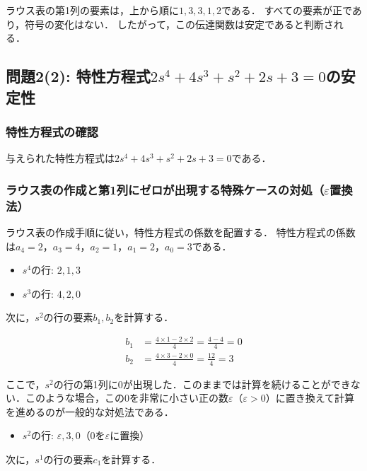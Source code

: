 \documentclass[11pt,a4paper]{ltjsarticle}
\begin{document}
ラウス表の第1列の要素は，上から順に$1, 3, 3, 1, 2$である．
すべての要素が正であり，符号の変化はない．
したがって，この伝達関数は安定であると判断される．

\subsection{\texorpdfstring{問題2(2): 特性方程式$2s^4+4s^3+s^2+2s+3=0$の安定性}{問題2(2): 特性方程式の安定性}}

\subsubsection{特性方程式の確認}

与えられた特性方程式は$2s^4+4s^3+s^2+2s+3=0$である．

\subsubsection{\texorpdfstring{ラウス表の作成と第1列にゼロが出現する特殊ケースの対処（$\varepsilon$置換法）}{ラウス表の作成と第1列にゼロが出現する特殊ケースの対処（イプシロン置換法）}}

ラウス表の作成手順に従い，特性方程式の係数を配置する．
特性方程式の係数は$a_4=2$，$a_3=4$，$a_2=1$，$a_1=2$，$a_0=3$である．

\begin{itemize}
\item $s^4$の行: $2, 1, 3$
\item $s^3$の行: $4, 2, 0$
\end{itemize}

次に，$s^2$の行の要素$b_1, b_2$を計算する．

\begin{align}
b_1 &= \frac{4 \times 1 - 2 \times 2}{4} = \frac{4-4}{4} = 0 \\
b_2 &= \frac{4 \times 3 - 2 \times 0}{4} = \frac{12}{4} = 3
\end{align}

ここで，$s^2$の行の第1列に0が出現した．このままでは計算を続けることができない．このような場合，この0を非常に小さい正の数$\varepsilon$（$\varepsilon > 0$）に置き換えて計算を進めるのが一般的な対処法である．

\begin{itemize}
\item $s^2$の行: $\varepsilon, 3, 0$（0を$\varepsilon$に置換）
\end{itemize}

次に，$s^1$の行の要素$c_1$を計算する．
\end{document}
